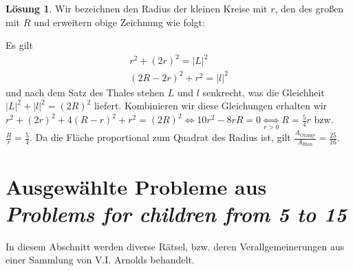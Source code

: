 \documentclass{article}
\theoremstyle{plain} %
\theoremstyle{definition} %
\newtheorem{solution}[theorem]{Lösung}
\begin{document}
\begin{solution}
  Wir bezeichnen den Radius der kleinen Kreise mit $r$, den des großen mit $R$ und erweitern obige Zeichnung wie folgt:

  \begin{center}
  \end{center}

  Es gilt
  \begin{align*}
    r^2 + (2r)^2 = |L|^2 \\
    (2R - 2r)^2 + r^2 = |l|^2
  \end{align*}
  und nach dem Satz des Thales stehen $L$ und $l$ senkrecht, was die Gleichheit $|L|^2 + |l|^2 = (2R)^2$ liefert. Kombinieren wir diese Gleichungen erhalten wir $r^2 + (2r)^2 + 4(R - r)^2 + r^2 = (2R)^2 \iff 10r^2 - 8rR = 0 \underset{r > 0}{\iff} R = \frac{5}{4}r$ bzw. $\frac{R}{r} = \frac{5}{4}$. Da die Fläche proportional zum Quadrat des Radius ist, gilt $\frac{A_{\text{Orange}}}{A_{\text{Blau}}} = \frac{25}{16}$.
\end{solution}

\section{Ausgewählte Probleme aus \emph{Problems for children from 5 to 15}}

In diesem Abschnitt werden diverse Rätsel, bzw. deren Verallgemeinerungen aus einer Sammlung von V.I. Arnolds behandelt\cite{ProblemsChildren}.
\end{document}
